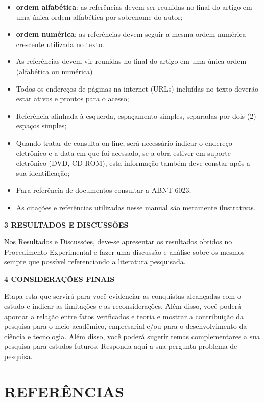 \documentclass[
]{article}
\begin{document}
\begin{itemize}
\item
  \textbf{ordem alfabética}: as referências devem ser reunidas no final
  do artigo em uma única ordem alfabética por sobrenome do autor;
\item
  \textbf{ordem numérica}: as referências devem seguir a mesma ordem
  numérica crescente utilizada no texto.
\item
  As referências devem vir reunidas no final do artigo em uma única
  ordem (alfabética ou numérica)
\item
  Todos os endereços de páginas na internet (URLs) incluídas no texto
  deverão estar ativos e prontos para o acesso;
\item
  Referência alinhada à esquerda, espaçamento simples, separadas por
  dois (2) espaços simples;
\item
  Quando tratar de consulta on-line, será necessário indicar o endereço
  eletrônico e a data em que foi acessado, se a obra estiver em suporte
  eletrônico (DVD, CD-ROM), esta informação também deve constar após a
  sua identificação;
\item
  Para referência de documentos consultar a ABNT 6023;
\item
  As citações e referências utilizadas nesse manual são meramente
  ilustrativas.
\end{itemize}

\textbf{3 RESULTADOS E DISCUSSÕES}

Nos Resultados e Discussões, deve-se apresentar os resultados obtidos no
Procedimento Experimental e fazer uma discussão e análise sobre os
mesmos sempre que possível referenciando a literatura pesquisada.

\textbf{4 CONSIDERAÇÕES FINAIS}

Etapa esta que servirá para você evidenciar as conquistas alcançadas com
o estudo e indicar as limitações e as reconsiderações. Além disso, você
poderá apontar a relação entre fatos verificados e teoria e mostrar a
contribuição da pesquisa para o meio acadêmico, empresarial e/ou para o
desenvolvimento da ciência e tecnologia. Além disso, você poderá sugerir
temas complementares a sua pesquisa para estudos futuros. Responda aqui
a sua pergunta-problema de pesquisa.

\section{REFERÊNCIAS}\label{referuxeancias}
\end{document}
